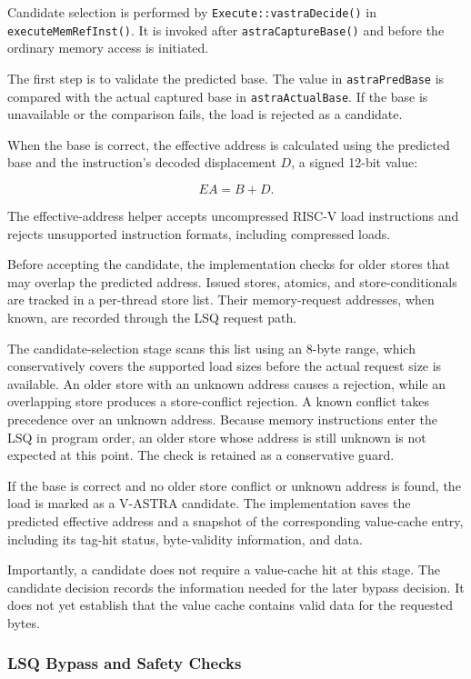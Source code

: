 Candidate selection is performed by
\texttt{Execute::vastraDecide()} in
\texttt{executeMemRefInst()}. It is invoked after
\texttt{astraCaptureBase()} and before the ordinary memory
access is initiated.

The first step is to validate the predicted base. The value in
\texttt{astraPredBase} is compared with the actual captured base
in \texttt{astraActualBase}. If the base is unavailable or
the comparison fails, the load is rejected as a candidate.

When the base is correct, the effective address is calculated
using the predicted base and the instruction's decoded
displacement \(D\), a signed 12-bit value:

\[
    EA = B + D.
\]

The effective-address helper accepts
uncompressed RISC-V load instructions and rejects unsupported
instruction formats, including compressed loads.

Before accepting the candidate, the implementation checks
for older stores that may overlap the predicted address.
Issued stores, atomics, and store-conditionals are tracked
in a per-thread store list. Their memory-request addresses,
when known, are recorded through the LSQ request path.

The candidate-selection stage scans this list using an
8-byte range, which conservatively covers the supported
load sizes before the actual request size is available.
An older store with an unknown address causes a rejection,
while an overlapping store produces a store-conflict rejection.
A known conflict takes precedence over an unknown address.
Because memory instructions enter the LSQ in program order, an older
store whose address is still unknown is not expected at this point.
The check is retained as a conservative guard.

If the base is correct and no older store conflict or unknown
address is found, the load is marked as a V-ASTRA candidate.
The implementation saves the predicted effective address
and a snapshot of the corresponding value-cache entry, including its
tag-hit status, byte-validity information, and data.

Importantly, a candidate does not require a value-cache hit at this
stage. The candidate decision records the information needed
for the later bypass decision. It does not yet establish that
the value cache contains valid data for the requested bytes.

\subsubsection{LSQ Bypass and Safety Checks}

